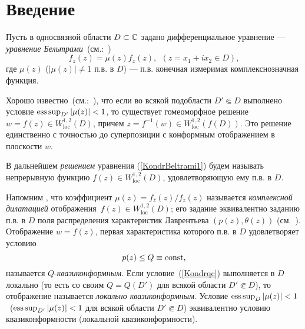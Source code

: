 

\section*{Введение}

 Пусть в односвязной области
$D\subset\mathbb{C}$ задано дифференциальное уравнение ---
\emph{уравнение Бельтрами}~(см.:~\cite[гл. 2]{KondrVekua})
\begin{equation}
\label{KondrBeltrami1}
f_{\overline{z}}(z)=\mu(z)f_{z}(z), \ \ (z=x_1+i x_2\in D),
\end{equation}
где $\mu(z)$ ($|\mu(z)|\ne1$ п.в. в $D$) --- п.в. конечная измеримая  комплекснозначная  функция.

Хорошо известно~(см.:~\cite[гл. 2]{KondrVekua}), что если
  во всякой подобласти  $D'\Subset D$ выполнено условие
$\mathop{\mathrm{ess\, sup}}\nolimits_{D'}|\mu(z)|<1$, то существует гомеоморфное решение $w=f (z)\in W^{1,2}_{\mathrm{loc}}(D)$, причем  $z=f^{-1} (w)\in W^{1,2}_{\mathrm{loc}}(f(D))$.
Это решение единственно с точностью до суперпозиции с конформным  отображением  в плоскости $w$.

В дальнейшем  \emph{решением} уравнения (\ref{KondrBeltrami1}) будем называть непрерывную функцию $f(z)\in W^{1,2}_{\mathrm{loc}}(D)$,
удовлетворяющую ему п.в. в $D$.

Напомним \cite[c.~7]{KondrBel}, что коэффициент $\mu(z)=f_{\overline{z}}(z)/f_{z}(z)$ называется
\emph{комплексной дилатацией} отображения~$f(z)\in W^{1,2}_{\mathrm{loc}}(D)$;
его задание эквивалентно заданию п.в. в $D$ поля распределения характеристик
Лаврентьева $(p(z),\theta(z))$ (см.~\cite{KondrLavr}).
 Отображение $w=f(z)$, первая  характеристика
 которого п.в. в $D$   удовлетворяет условию
\begin{equation}\label{Kondrqc}
p(z)\leq Q\equiv\mathrm{const},
\end{equation}
называется $Q$-\textit{квазиконформным}. Если условие~(\ref{Kondrqc}) выполняется в $D$ локально (то есть со своим $Q=Q(D')$ для всякой области $D'\Subset D$), то отображение
называется \textit{локально квазиконформным}.
Условие $\mathop{\mathrm{ess\, sup}}\nolimits_{D}|\mu(z)|<1$~($\mathop{\mathrm{ess\, sup}}\nolimits_{D'}|\mu(z)|<1$ для всякой области $D'\Subset D$) эквивалентно условию квазиконформности (локальной квазиконформности).

